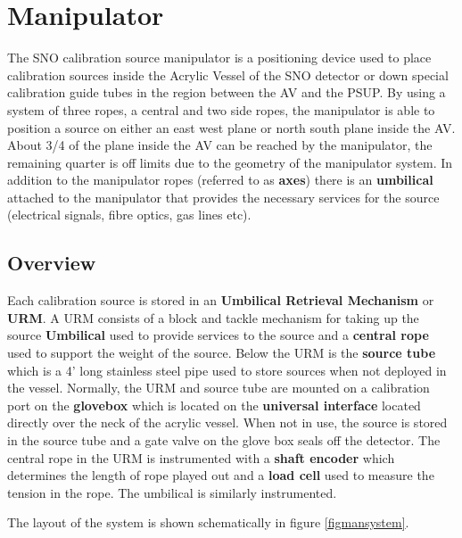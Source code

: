 

\chapter{Manipulator}
  


  The SNO calibration source manipulator is a positioning device
used to place calibration sources inside the Acrylic Vessel of the
SNO detector or down special calibration guide tubes in the region between
the AV and the PSUP.  By using a system of three ropes, a central and two
side ropes, the manipulator is able to position a source on either an east
west plane or north south plane inside the AV.  About 3/4 of the plane inside
the AV can be reached by the manipulator, the remaining quarter is off limits
due to the geometry of the manipulator system.  In addition to the manipulator
ropes (referred to as {\bf axes}) there is an {\bf umbilical} attached
to the manipulator that provides the necessary services for the source
(electrical signals, fibre optics, gas lines etc).
  
\section{Overview}
  Each calibration source is stored in an {\bf Umbilical Retrieval Mechanism}
or {\bf URM}.  A URM consists of a block and tackle mechanism for taking
up the source {\bf Umbilical} used to provide services to the source
and a {\bf central rope} used to support the weight of the source.  Below
the URM is the {\bf source tube} which is a 4' long stainless steel pipe
used to store sources when not deployed in the vessel.  Normally, the 
URM and source tube are mounted on a calibration port on the {\bf glovebox}
which is located on the {\bf universal interface} located directly over
the neck of the acrylic vessel.  When not in use, the source is stored in
the source tube and a gate valve on the glove box seals off the detector.
The central rope in the URM is instrumented with a {\bf shaft encoder}
which determines the length of rope played out and a {\bf load cell} used
to measure the tension in the rope.  The umbilical is similarly instrumented.
  
  The layout of the system is shown schematically in figure \ref{figmansystem}.

